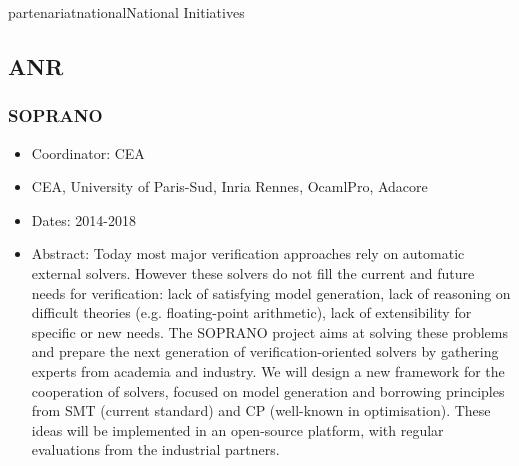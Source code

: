 \documentclass{ra2018}
\begin{document}
 \begin{module}{partenariat}{national}{National Initiatives}


 \subsection{ANR}


\subsubsection*{\label{project:soprano}SOPRANO}
\begin{itemize}
	\item Coordinator: CEA
	\item CEA, University of Paris-Sud, Inria Rennes, OcamlPro, Adacore
	\item Dates: 2014-2018
	\item Abstract:  Today most major verification
    approaches rely on automatic external
    solvers. However these solvers do not fill the current and
    future needs for verification: lack of satisfying model
    generation, lack of reasoning on difficult theories
    (e.g. floating-point arithmetic), lack of extensibility for
    specific or new needs. The SOPRANO 
    project aims at solving these problems and prepare the next generation of verification-oriented
    solvers by gathering experts
    from academia and industry.
     We will design a new framework for the cooperation of
    solvers, focused on model generation and borrowing principles from
    SMT (current standard) and CP (well-known in optimisation).
    These ideas will be implemented in an open-source platform, with regular evaluations
    from the industrial partners.
\end{itemize}


\end{module}
\end{document}
